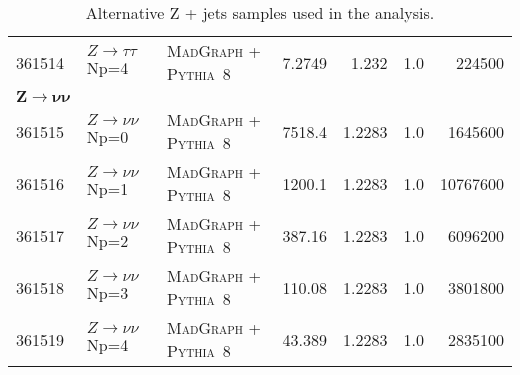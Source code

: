 \begin{table}[!htb]
{\begin{tabular}{lllrrrr}
    361514 & $Z \to \tau\tau$ Np=4 & \textsc{MadGraph} + \textsc{Pythia}~8 & 7.2749& 1.232 & 1.0 & 224500\\
    $\bm{Z \to \nu \nu}$ &&&&&&\\
    361515 & $Z \to \nu\nu$ Np=0 & \textsc{MadGraph} + \textsc{Pythia}~8 & 7518.4 & 1.2283 & 1.0 & 1645600\\ 
    361516 & $Z \to \nu\nu$ Np=1 & \textsc{MadGraph} + \textsc{Pythia}~8 & 1200.1& 1.2283 & 1.0 & 10767600\\
    361517 & $Z \to \nu\nu$ Np=2 & \textsc{MadGraph} + \textsc{Pythia}~8 & 387.16& 1.2283 & 1.0 & 6096200\\
    361518 & $Z \to \nu\nu$ Np=3 & \textsc{MadGraph} + \textsc{Pythia}~8 & 110.08& 1.2283 & 1.0 & 3801800\\
    361519 & $Z \to \nu\nu$ Np=4 & \textsc{MadGraph} + \textsc{Pythia}~8 & 43.389& 1.2283 & 1.0 & 2835100\\
    \bottomrule
  \end{tabular}
  }
  \caption{Alternative Z + jets samples used in the analysis.}
  \label{tabular:zjetsAlternativeSamples}
\end{table}